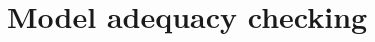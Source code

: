 \documentclass{article}
\begin{document}

%


\section{Model adequacy checking}
\setcounter{theorem}{0}
\end{document}
